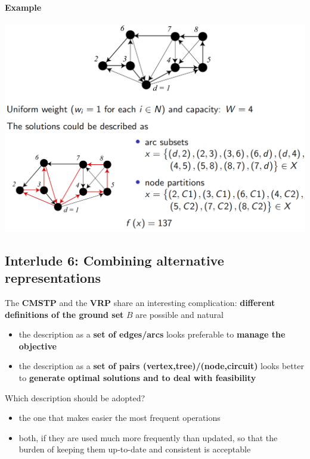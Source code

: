 \paragraph{Example}
\begin{center}
	\includegraphics[width=0.9\columnwidth]{img/VRP1}
\end{center}

\newpage

\subsection*{Interlude 6: Combining alternative representations}
The \textbf{CMSTP} and the \textbf{VRP} share an interesting complication: \textbf{different definitions of the ground set} $B$ are possible and natural
\begin{itemize}
	\item the description as a \textbf{set of edges/arcs} looks preferable to \textbf{manage the objective}
	\item the description as a \textbf{set of pairs (vertex,tree)/(node,circuit)} looks better to \textbf{generate optimal solutions and to deal with feasibility}
\end{itemize}

Which description should be adopted?
\begin{itemize}
	\item the one that makes easier the most frequent operations
	\item both, if they are used much more frequently than updated, so that the burden of keeping them up-to-date and consistent is acceptable
\end{itemize}


\newpage